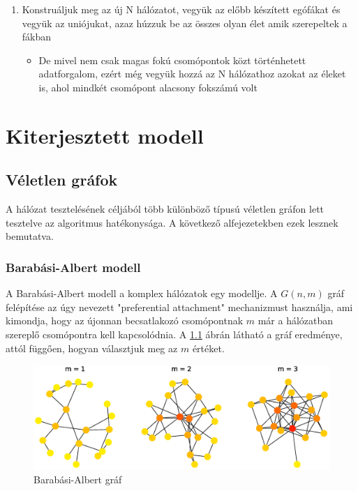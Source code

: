 \documentclass[12pt]{report}
\begin{document}
\begin{enumerate}
\begin{itemize}
	\end{itemize}
	\item Konstruáljuk meg az új N hálózatot, vegyük az előbb készített egófákat és vegyük az uniójukat, azaz húzzuk be az összes olyan élet amik szerepeltek a fákban
	\begin{itemize}
		\item     De mivel nem csak magas fokú csomópontok közt történhetett adatforgalom, ezért még vegyük hozzá az N hálózathoz azokat az éleket is, ahol mindkét csomópont alacsony fokszámú volt
	\end{itemize}
\end{enumerate}

\chapter{Kiterjesztett modell}

\section{Véletlen gráfok}

A hálózat tesztelésének céljából több különböző típusú véletlen gráfon lett tesztelve az algoritmus hatékonysága.
A következő alfejezetekben ezek lesznek bemutatva.

\subsection{Barabási-Albert modell}

A Barabási-Albert modell \cite{RevModPhys.74.47} a komplex hálózatok egy modellje. 
A \(G(n, m)\) gráf felépítése az úgy nevezett "preferential attachment" mechanizmust használja, ami kimondja, hogy az újonnan becsatlakozó csomópontnak \(m\) már a hálózatban szereplő csomópontra kell kapcsolódnia. A \ref{barabasi} ábrán látható a gráf eredménye, attól függően, hogyan választjuk meg az \(m\) értéket.

\begin{figure}[H]
	\begin{center}
		\includegraphics[width=0.9\linewidth]{pictures/Barabasi_albert_graph.eps}
		\caption{Barabási-Albert gráf \cite{wikipedia_barabasi}}
		\label{barabasi}
	\end{center}
\end{figure}
\end{document}
